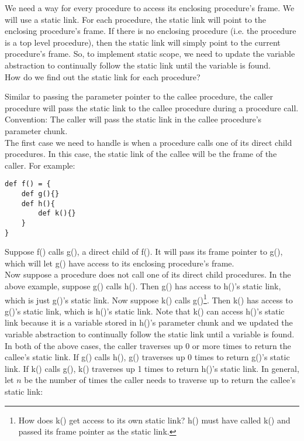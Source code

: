 \documentclass[12pt, letterpaper]{article}
\begin{document}
We need a way for every procedure to access its enclosing procedure's frame. We will use a static link. For each procedure, the static link will point to the enclosing procedure's frame. If there is no enclosing procedure (i.e. the procedure is a top level procedure), then the static link will simply point to the current procedure's frame. So, to implement static scope, we need to update the variable abstraction to continually follow the static link until the variable is found. \\

How do we find out the static link for each procedure?

Similar to passing the parameter pointer to the callee procedure, the caller procedure will pass the static link to the callee procedure during a procedure call.\\

Convention: The caller will pass the static link in the callee procedure's parameter chunk.\\

The first case we need to handle is when a procedure calls one of its direct child procedures. In this case, the static link of the callee will be the frame of the caller. For example:\\

\begin{lstlisting}
def f() = {
	def g(){}
	def h(){
		def k(){}	
	}
}
\end{lstlisting}

Suppose f() calls g(), a direct child of f(). It will pass its frame pointer to g(), which will let g() have access to its enclosing procedure's frame.\\

Now suppose a procedure does not call one of its direct child procedures. In the above example, suppose g() calls h(). Then g() has access to h()'s static link, which is just g()'s static link. Now suppose k() calls g()\footnote{How does k() get access to its own static link? h() must have called k() and passed its frame pointer as the static link. }. Then k() has access to g()'s static link, which is h()'s static link. Note that k() can access h()'s static link because it is a variable stored in h()'s parameter chunk and we updated the variable abstraction to continually follow the static link until a variable is found.\\

In both of the above cases, the caller traverses up 0 or more times to return the callee's static link. If g() calls h(), g() traverses up 0 times to return g()'s static link. If k() calls g(), k() traverses up 1 times to return h()'s static link. In general, let \(n\) be the number of times the caller needs to traverse up to return the callee's static link:
\end{document}

